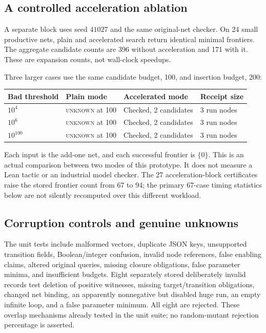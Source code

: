 \documentclass[11pt,a4paper]{article}
\newcommand{\unknown}{\textsc{unknown}}
\theoremstyle{definition}
\theoremstyle{remark}
\begin{document}
\subsection{A controlled acceleration ablation}
A separate block uses seed $41027$ and the same original-net checker. On 24 small productive nets, plain and accelerated search return identical minimal frontiers. The aggregate candidate counts are 396 without acceleration and 171 with it. These are expansion counts, not wall-clock speedups.

Three larger cases use the same candidate budget, 100, and insertion budget, 200:
\begin{center}
\begin{tabular}{@{}llll@{}}
\toprule
Bad threshold & Plain mode & Accelerated mode & Receipt size\\
\midrule
$10^4$ & \unknown{} at 100 & Checked, 2 candidates & 3 run nodes\\
$10^6$ & \unknown{} at 100 & Checked, 2 candidates & 3 run nodes\\
$10^{100}$ & \unknown{} at 100 & Checked, 2 candidates & 3 run nodes\\
\bottomrule
\end{tabular}
\end{center}
Each input is the add-one net, and each successful frontier is $\{0\}$. This is an actual comparison between two modes of this prototype. It does not measure a Lean tactic or an industrial model checker. The 27 acceleration-block certificates raise the stored frontier count from 67 to 94; the primary 67-case timing statistics below are not silently recomputed over this different workload.

\subsection{Corruption controls and genuine unknowns}
The unit tests include malformed vectors, duplicate JSON keys, unsupported transition fields, Boolean/integer confusion, invalid node references, false enabling claims, altered original queries, missing closure obligations, false parameter minima, and insufficient budgets. Eight separately stored deliberately invalid records test deletion of positive witnesses, missing target/transition obligations, changed net binding, an apparently nonnegative but disabled huge run, an empty infinite loop, and a false parameter minimum. All eight are rejected. These overlap mechanisms already tested in the unit suite; no random-mutant rejection percentage is asserted.
\end{document}
